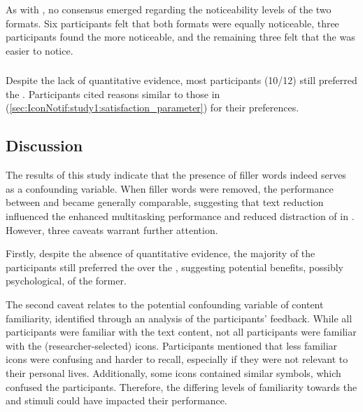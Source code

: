 \subsubsection*{\Reaction{}}
\label{sec:IconNotif:study2:reaction_parameter}

As with \studyone{}, no consensus emerged regarding the noticeability levels of the two formats.
Six participants felt that both formats were equally noticeable, three participants found the \textformat{} more noticeable, and the remaining three felt that the \iconformat{} was easier to notice.

\subsubsection*{\Satisfaction{}}
\label{sec:IconNotif:study2:satisfaction_parameter}

Despite the lack of quantitative evidence, most participants (10/12) still preferred the \iconformat{}. Participants cited reasons similar to those in \studyone{} (\autoref{sec:IconNotif:study1:satisfaction_parameter}) for their preferences.


\subsection{Discussion}
\label{sec:IconNotif:study2:discussion}

The results of this study indicate that the presence of filler words indeed serves as a confounding variable. When filler words were removed, the performance between \iconformat{} and \textformat{} became generally comparable, suggesting that text reduction influenced the enhanced multitasking performance and reduced distraction of  in \studyone{}. However, three caveats warrant further attention. 

Firstly, despite the absence of quantitative evidence, the majority of the participants still preferred the \iconformat{} over the \textformat{}, suggesting potential benefits, possibly psychological, of the former. 

The second caveat relates to the potential confounding variable of content familiarity, identified through an analysis of the participants' feedback. While all participants were familiar with the text content, not all participants were familiar with the (researcher-selected) icons. Participants mentioned that less familiar icons were confusing and harder to recall, especially if they were not relevant to their personal lives. Additionally, some icons contained similar symbols, which confused the participants. Therefore, the differing levels of familiarity towards the \iconformat{} and \textformat{} stimuli could have impacted their performance. 

